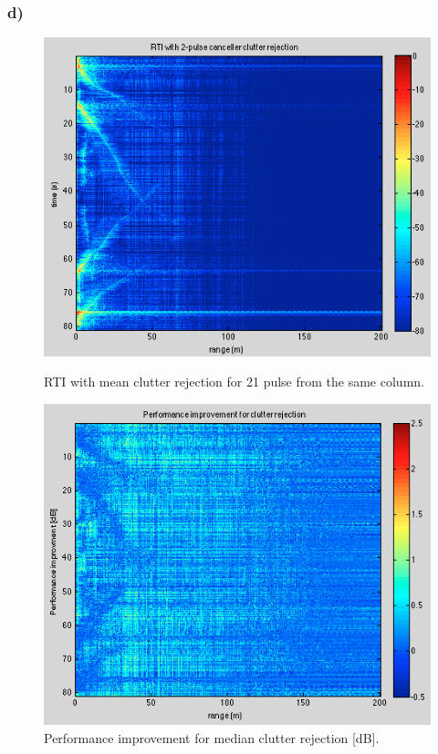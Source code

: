 \documentclass{article}
\begin{document}
\subsubsection{d)}

\begin{figure}[hbt]
\begin{minipage}[b]{0.5\linewidth}
\centering
\includegraphics[width=\textwidth]{Figures/custom_rejection.png}
\caption{RTI with mean clutter rejection for 21 pulse from the same column.}
\label{fig:custom_rejection}
\end{minipage}
\begin{minipage}[b]{0.5\linewidth}
\centering
\includegraphics[width=\textwidth]{Figures/custom_improvment.png}
\caption{Performance improvement for median clutter rejection [dB].}
\label{fig:custom_improvment}
\end{minipage}
\end{figure}
\end{document}
